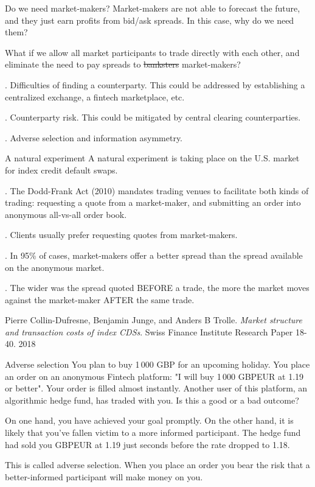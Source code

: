 \documentclass{beamer}
\begin{document}
\begin{frame}{Do we need market-makers?}
\justify
Market-makers are not able to forecast the future, and they just earn profits from bid/ask spreads. In this case, why do we need them?

\justify
What if we allow all market participants to trade directly with each other, and eliminate the need to pay spreads to \sout{banksters} market-makers?

. Difficulties of finding a counterparty. This could be addressed by establishing a centralized exchange, a fintech marketplace, etc.

. Counterparty risk. This could be mitigated by central clearing counterparties.

. Adverse selection and information asymmetry.
\end{frame}



\begin{frame}{A natural experiment}
\justify
A natural experiment is taking place on the U.S. market for index credit default swaps.

. The Dodd-Frank Act (2010) mandates trading venues to facilitate both kinds of trading: requesting a quote from a market-maker, and submitting an order into anonymous all-vs-all order book.

. Clients usually prefer requesting quotes from market-makers.

. In 95\% of cases, market-makers offer a better spread than the spread available on the anonymous market.

. The wider was the spread quoted BEFORE a trade, the more the market moves against the market-maker AFTER the same trade.

\justify
\small{Pierre Collin-Dufresne, Benjamin Junge, and Anders B Trolle. \textit{Market structure and transaction costs of index CDSs}. Swiss Finance Institute Research Paper 18-40. 2018}
\end{frame}


\begin{frame}{Adverse selection}
\justify
You plan to buy 1\,000 GBP for an upcoming holiday. You place an order on an anonymous Fintech platform: "I will buy 1\,000 GBPEUR at 1.19 or better". Your order is filled almost instantly. Another user of this platform, an algorithmic hedge fund, has traded with you. Is this a good or a bad outcome?

\justify
On one hand, you have achieved your goal promptly. On the other hand, it is likely that you've fallen victim to a more informed participant. The hedge fund had sold you GBPEUR at 1.19 just seconds before the rate dropped to 1.18.

\justify
This is called \alert{adverse selection}. When you place an order you bear the risk that a better-informed participant will make money on you.
\end{frame}
\end{document}
